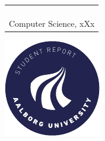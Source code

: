 \begin{titlepage}
{{\begin{tabular}{@{}p{\textwidth}@{}}
\begin{center}
{      }
    \end{center}
    \vspace{0.2cm}
   \begin{center}
    {\Large
      Daniel Runge Petersen, Nutsy Superman%
    }\\
    \vspace{0.2cm}
    {\large
      Computer Science, xXx%
    }
   \end{center}
   \vspace{0.2cm}
   \begin{center}
    {\Large
      Semester Project
    }
   \end{center}
  \end{tabular}}}
  \vfill
  \begin{center}
    \includegraphics[width=0.2\paperwidth]{figures/AAUgraphics/aau_logo_circle_en}%
  \end{center}
\end{titlepage}
\clearpage
